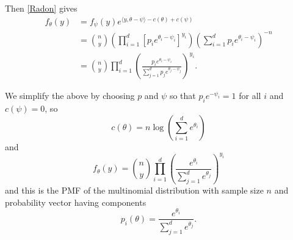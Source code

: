 \documentclass[
  ignorenonframetext,
]{beamer}
\begin{document}
\begin{frame}{}
\protect\hypertarget{section-7}{}
Then \eqref{Radon} gives \begin{align*}
  f_{\theta}(y) &= f_{\psi}(y)e^{\langle y,\theta-\psi\rangle - c(\theta) + c(\psi)} \\
    &= {n \choose y} \left(\prod_{i=1}^d\left[p_ie^{\theta_i-\psi_i}\right]^{y_i}\right)\left(\sum_{i=1}^d p_ie^{\theta_i-\psi_i}\right)^{-n} \\
    &= {n \choose y} \prod_{i=1}^d \left(\frac{p_ie^{\theta_i-\psi_i}}{\sum_{j=1}^dp_je^{\theta_j-\psi_j}}\right)^{y_i}.
\end{align*}
\end{frame}

\begin{frame}{}
\protect\hypertarget{section-8}{}
We simplify the above by choosing \(p\) and \(\psi\) so that
\(p_ie^{-\psi_i} = 1\) for all \(i\) and \(c(\psi) = 0\), so \[
  c(\theta) = n\log\left(\sum_{i=1}^d e^{\theta_i}\right)
\] and \[
  f_{\theta}(y) = {n \choose y}\prod_{i=1}^d \left(\frac{e^{\theta_i}}{\sum_{j=1}^d e^{\theta_j}}\right)^{y_i}
\] and this is the PMF of the multinomial distribution with sample size
\(n\) and probability vector having components \[
  p_i(\theta) = \frac{e^{\theta_i}}{\sum_{j=1}^d e^{\theta_j}}.
\]
\end{frame}
\end{document}
